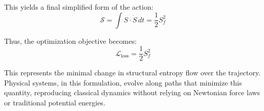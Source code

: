 \documentclass[12pt]{article}
\begin{document}
This yields a final simplified form of the action:
\[
\mathcal{S} = \int S \cdot \dot{S} \, dt = \frac{1}{2} S_f^2
\]

Thus, the optimization objective becomes:
\[
\boxed{
\mathcal{L}_\text{loss} = \frac{1}{2} S_f^2
}
\]

This represents the minimal change in structural entropy flow over the trajectory. Physical systems, in this formulation, evolve along paths that minimize this quantity, reproducing classical dynamics without relying on Newtonian force laws or traditional potential energies.







\end{document}
